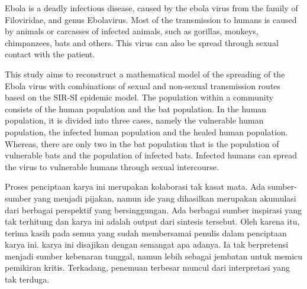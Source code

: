 \documentclass{SkripsiUnesa}
\begin{document}
\begin{Abstract}
	
Ebola is a deadly infectious disease, caused by the ebola virus from the family of Filoviridae, and genus Ebolavirus. Most of the transmission to humans is caused by animals or carcasses of infected animals, such as gorillas, monkeys, chimpanzees, bats and others. This virus can also be spread through sexual contact with the patient.
	
This study aims to reconstruct a mathematical model of the spreading of the Ebola virus with combinations of sexual and non-sexual transmission routes based on the SIR-SI epidemic model. The population within a community consists of the human population and the bat population. In the human population, it is divided into three cases, namely the vulnerable human population, the infected human population and the healed human population. Whereas, there are only two in the bat population that is the population of vulnerable bats and the population of infected bats. Infected humans can spread the virus to vulnerable humans through sexual intercourse.
\end{Abstract}

\SuratPernyataan
\HalamanPersetujuan %
\HalamanPengesahan %

\Prakata

Proses penciptaan karya ini merupakan kolaborasi tak kasat mata. Ada sumber-sumber yang menjadi pijakan, namun ide yang dihasilkan merupakan akumulasi dari berbagai perspektif yang bersinggungan. Ada berbagai sumber inspirasi yang tak terhitung dan karya ini adalah output dari sintesis tersebut. Oleh karena itu, terima kasih pada semua yang sudah membersamai penulis dalam penciptaan karya ini. karya ini disajikan dengan semangat apa adanya. Ia tak berpretensi menjadi sumber kebenaran tunggal, namun lebih sebagai jembatan untuk memicu pemikiran kritis. Terkadang, penemuan terbesar muncul dari interpretasi yang tak terduga.
\end{document}
